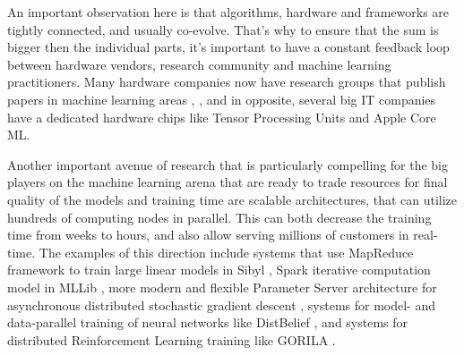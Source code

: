 An important observation here is that algorithms, hardware and frameworks are tightly connected,
and usually co-evolve. That's why to ensure that the sum is bigger then the individual parts,
it's important to have a constant feedback loop between hardware vendors, research community
and machine learning practitioners. Many hardware companies now have research groups
that publish papers in machine learning areas \cite{babaeizadeh2016ga3c}, \cite{dosovitskiy2016learning},
and in opposite, several big IT companies have a dedicated hardware chips like Tensor Processing 
Units \cite{jouppi2017datacenter} and Apple Core ML.


Another important avenue of research that is particularly compelling for the big players on the machine
learning arena that are ready to trade resources for final quality of the models and training time
are scalable architectures, that can utilize hundreds of computing nodes
in parallel. This can both decrease the training time from weeks to hours, and also allow
serving millions of customers in real-time. The examples of this direction include systems
that use MapReduce \cite{dean2008mapreduce} framework to train large linear models in Sibyl \cite{chandra2010sibyl},
Spark iterative computation model in MLLib \cite{meng2016mllib}, more modern and flexible Parameter Server architecture
for asynchronous distributed stochastic gradient descent \cite{recht2011hogwild}, systems for model- and
data-parallel training of neural networks like DistBelief \cite{dean2012large}, and systems for distributed
Reinforcement Learning training like GORILA \cite{nair2015massively}.


